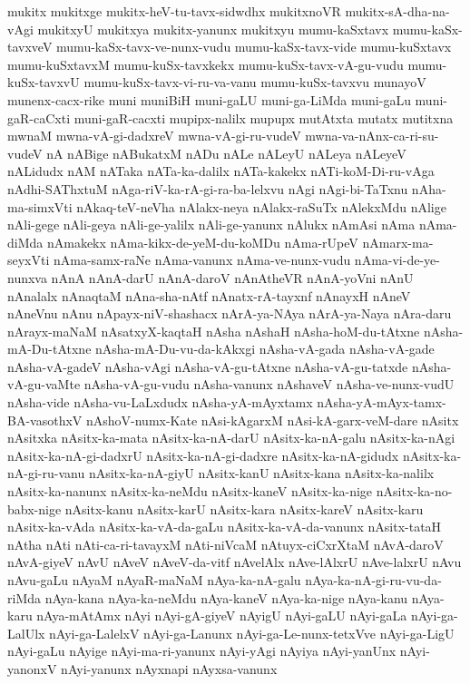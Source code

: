 {mukitx
mukitxge
mukitx-heV-tu-tavx-sidwdhx
mukitxnoVR
mukitx-sA-dha-na-vAgi
mukitxyU
mukitxya
mukitx-yanunx
mukitxyu
mumu-kaSxtavx
mumu-kaSx-tavxveV
mumu-kaSx-tavx-ve-nunx-vudu
mumu-kaSx-tavx-vide
mumu-kuSxtavx
mumu-kuSxtavxM
mumu-kuSx-tavxkekx
mumu-kuSx-tavx-vA-gu-vudu
mumu-kuSx-tavxvU
mumu-kuSx-tavx-vi-ru-va-vanu
mumu-kuSx-tavxvu
munayoV
munenx-cacx-rike
muni
muniBiH
muni-gaLU
muni-ga-LiMda
muni-gaLu
muni-gaR-caCxti
muni-gaR-cacxti
mupipx-nalilx
mupupx
mutAtxta
mutatx
mutitxna
mwnaM
mwna-vA-gi-dadxreV
mwna-vA-gi-ru-vudeV
mwna-va-nAnx-ca-ri-su-vudeV
nA
nABige
nABukatxM
nADu
nALe
nALeyU
nALeya
nALeyeV
nALidudx
nAM
nATaka
nATa-ka-dalilx
nATa-kakekx
nATi-koM-Di-ru-vAga
nAdhi-SAThxtuM
nAga-riV-ka-rA-gi-ra-ba-lelxvu
nAgi
nAgi-bi-TaTxnu
nAha-ma-simxVti
nAkaq-teV-neVha
nAlakx-neya
nAlakx-raSuTx
nAlekxMdu
nAlige
nAli-gege
nAli-geya
nAli-ge-yalilx
nAli-ge-yanunx
nAlukx
nAmAsi
nAma
nAma-diMda
nAmakekx
nAma-kikx-de-yeM-du-koMDu
nAma-rUpeV
nAmarx-ma-seyxVti
nAma-samx-raNe
nAma-vanunx
nAma-ve-nunx-vudu
nAma-vi-de-ye-nunxva
nAnA
nAnA-darU
nAnA-daroV
nAnAtheVR
nAnA-yoVni
nAnU
nAnalalx
nAnaqtaM
nAna-sha-nAtf
nAnatx-rA-tayxnf
nAnayxH
nAneV
nAneVnu
nAnu
nApayx-niV-shashacx
nArA-ya-NAya
nArA-ya-Naya
nAra-daru
nArayx-maNaM
nAsatxyX-kaqtaH
nAsha
nAshaH
nAsha-hoM-du-tAtxne
nAsha-mA-Du-tAtxne
nAsha-mA-Du-vu-da-kAkxgi
nAsha-vA-gada
nAsha-vA-gade
nAsha-vA-gadeV
nAsha-vAgi
nAsha-vA-gu-tAtxne
nAsha-vA-gu-tatxde
nAsha-vA-gu-vaMte
nAsha-vA-gu-vudu
nAsha-vanunx
nAshaveV
nAsha-ve-nunx-vudU
nAsha-vide
nAsha-vu-LaLxdudx
nAsha-yA-mAyxtamx
nAsha-yA-mAyx-tamx-BA-vasothxV
nAshoV-numx-Kate
nAsi-kAgarxM
nAsi-kA-garx-veM-dare
nAsitx
nAsitxka
nAsitx-ka-mata
nAsitx-ka-nA-darU
nAsitx-ka-nA-galu
nAsitx-ka-nAgi
nAsitx-ka-nA-gi-dadxrU
nAsitx-ka-nA-gi-dadxre
nAsitx-ka-nA-gidudx
nAsitx-ka-nA-gi-ru-vanu
nAsitx-ka-nA-giyU
nAsitx-kanU
nAsitx-kana
nAsitx-ka-nalilx
nAsitx-ka-nanunx
nAsitx-ka-neMdu
nAsitx-kaneV
nAsitx-ka-nige
nAsitx-ka-no-babx-nige
nAsitx-kanu
nAsitx-karU
nAsitx-kara
nAsitx-kareV
nAsitx-karu
nAsitx-ka-vAda
nAsitx-ka-vA-da-gaLu
nAsitx-ka-vA-da-vanunx
nAsitx-tataH
nAtha
nAti
nAti-ca-ri-tavayxM
nAti-niVcaM
nAtuyx-ciCxrXtaM
nAvA-daroV
nAvA-giyeV
nAvU
nAveV
nAveV-da-vitf
nAvelAlx
nAve-lAlxrU
nAve-lalxrU
nAvu
nAvu-gaLu
nAyaM
nAyaR-maNaM
nAya-ka-nA-galu
nAya-ka-nA-gi-ru-vu-da-riMda
nAya-kana
nAya-ka-neMdu
nAya-kaneV
nAya-ka-nige
nAya-kanu
nAya-karu
nAya-mAtAmx
nAyi
nAyi-gA-giyeV
nAyigU
nAyi-gaLU
nAyi-gaLa
nAyi-ga-LalUlx
nAyi-ga-LalelxV
nAyi-ga-Lanunx
nAyi-ga-Le-nunx-tetxVve
nAyi-ga-LigU
nAyi-gaLu
nAyige
nAyi-ma-ri-yanunx
nAyi-yAgi
nAyiya
nAyi-yanUnx
nAyi-yanonxV
nAyi-yanunx
nAyxnapi
nAyxsa-vanunx
}
